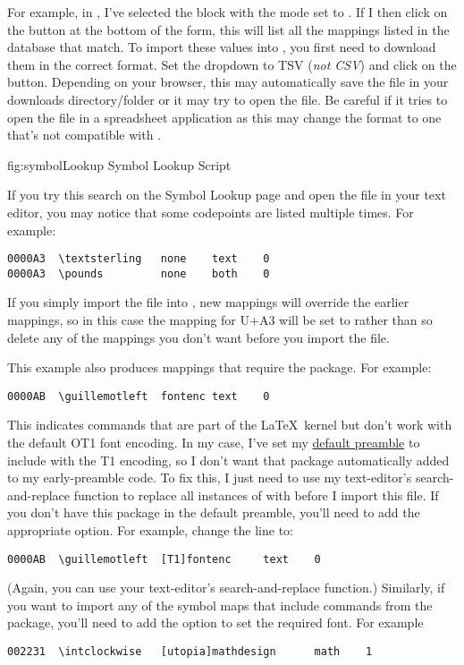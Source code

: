 For example, in , I've selected the
 block with the mode set to . If I
then click on the  button at the bottom of the form, this
will list all the mappings listed in the database that match. To
import these values into \FlowframTk, you first need to download
them in the correct format. Set the 
\gls{dropdown} to TSV (\emph{not CSV}) and click on the
 button. Depending on your browser, this may
automatically save the file  in your
downloads directory\slash folder or it may try to open the file.
Be careful if it tries to open the file in a spreadsheet application
as this may change the format to one that's not compatible with
\FlowframTk.

\FloatFig
  {fig:symbolLookup}
  {}
  {Symbol Lookup Script}

If you try this search on the Symbol Lookup page and open the file in your
 text editor, you may notice that some codepoints are listed
multiple times. For example:
\begin{verbatim}
0000A3  \textsterling   none    text    0
0000A3  \pounds         none    both    0
\end{verbatim}
If you simply import the file into \FlowframTk, new mappings will
override the earlier mappings, so in this case the mapping for
U+A3 will be set to  rather than
 so delete any of the mappings you don't want
before you import the file.

This example also produces mappings that require the 
package. For example:
\begin{verbatim}
0000AB  \guillemotleft  fontenc text    0
\end{verbatim}
This indicates commands that are part of the \LaTeX\ kernel but don't
work with the default OT1 font encoding. In my case, I've set my
\hyperref[sec:texconfigpreamble]{default preamble} to include
 with the T1 encoding, so I don't want that package
automatically added to my early-preamble code. To fix this, I just need to
use my text-editor's search-and-replace function to replace all instances of
 with  before I import this file. If you don't
have this package in the default preamble, you'll need to add the appropriate
option.  For example, change the line to:
\begin{verbatim}
0000AB  \guillemotleft  [T1]fontenc     text    0
\end{verbatim}
(Again, you can use your text-editor's search-and-replace function.)
Similarly, if you want to import any of the symbol maps that include
commands from the  package, you'll need to add
the option to set the required font. For example
\begin{verbatim}
002231  \intclockwise   [utopia]mathdesign      math    1
\end{verbatim}


